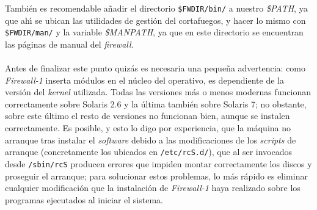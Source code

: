 Tambi\'en es recomendable a\~nadir el directorio {\tt \$FWDIR/bin/} a nuestro
{\it \$PATH}, ya que ah\'{\i} se ubican las utilidades de gesti\'on del
cortafuegos, y hacer lo mismo con {\tt \$FWDIR/man/} y la variable {\it 
\$MANPATH}, ya que en este directorio se encuentran las p\'aginas de manual del
{\it firewall}.\\
\\Antes de finalizar este punto quiz\'as es necesaria una peque\~na 
advertencia: como {\it Firewall-1} inserta
m\'odulos en el n\'ucleo del operativo, es dependiente de la versi\'on del
{\it kernel} utilizada. Todas las versiones m\'as o menos modernas funcionan
correctamente sobre Solaris 2.6 y la \'ultima tambi\'en sobre Solaris 7; no 
obstante, sobre este \'ultimo el resto de versiones no funcionan bien, aunque
se instalen correctamente. Es posible, y esto lo digo por experiencia, que la
m\'aquina no arranque tras instalar el {\it software} debido a las 
modificaciones de los {\it scripts} de arranque (concretamente los ubicados en
{\tt /etc/rcS.d/}), que al ser invocados desde {\tt /sbin/rcS} producen errores
que impiden montar correctamente los discos y proseguir el arranque; para 
solucionar estos problemas, lo m\'as r\'apido es eliminar cualquier 
modificaci\'on que la instalaci\'on de {\it Firewall-1} haya realizado sobre
los programas ejecutados al iniciar el sistema. 
